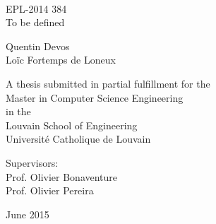 \documentclass[11pt,a4paper,oldfontcommands]{memoir}
\begin{document}
%
%
\thispagestyle{empty}

{%
\sffamily
\centering
\Large

~\vspace{\fill}

EPL-2014 384\\
{\huge 
To be defined
}

\vspace{2.5cm}

{\LARGE
Quentin Devos \\
Loïc Fortemps de Loneux
}

\vspace{3.5cm}

A thesis submitted in partial fulfillment for the\\
Master in Computer Science Engineering\\[1em]
in the\\[1em]
Louvain School of Engineering\\
Université Catholique de Louvain

\vspace{3.5cm}

Supervisors: \\
            Prof. Olivier Bonaventure\\
             Prof. Olivier Pereira

\vspace{\fill}

June 2015

}%

\cleardoublepage

\tableofcontents*
\clearpage

\listoffigures*
\clearpage


%

\appendix




\end{document}

